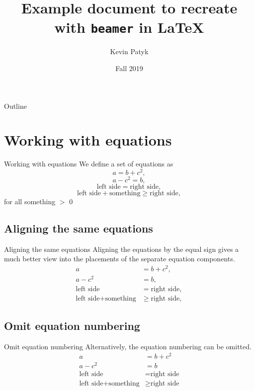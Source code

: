 \documentclass{beamer}
\title{Example document to recreate with \texttt{beamer} in \LaTeX{}}
\author{Kevin Patyk}
\date{\vspace*{-1cm}Fall 2019}
\institute{\vspace*{-2cm}Markup Languages and Reproducible Programming in Statistics}
\begin{document}
\begin{frame}
\titlepage
\end{frame}

\begin{frame}{Outline}
\tableofcontents
\end{frame}

\section{Working with equations}
\begin{frame}{Working with equations}
We define a set of equations as
\begin{equation}
a = b+c^2,
\end{equation}
\begin{equation}
a - c^2 = b,
\end{equation}
\begin{equation}
\text{left side} = \text{right side},
\end{equation}
\begin{equation}
\text{left side} + \text{something} \geq \text{right side},
\end{equation}
for all something $>$ 0
\end{frame}

\subsection{Aligning the same equations}
\begin{frame}{Aligning the same equations}
Aligning the equations by the equal sign gives a much better view into the placements
of the separate equation components.
\begin{align}
a&=b+c^2,\\
a-c^2&=b,\\
\text{left side} &= \text{right side},\\
\text{left side} + \text{something} & \geq \text{right side},
\end{align}
\end{frame}

\subsection{Omit equation numbering}
\begin{frame}{Omit equation numbering}
Alternatively, the equation numbering can be omitted.
\begin{align*}
a&=b+c^2\\
a-c^2&=b\\
\text{left side} &= \text{right side}\\
\text{left side} + \text{something} & \geq \text{right side}
\end{align*}
\end{frame}
\end{document}
